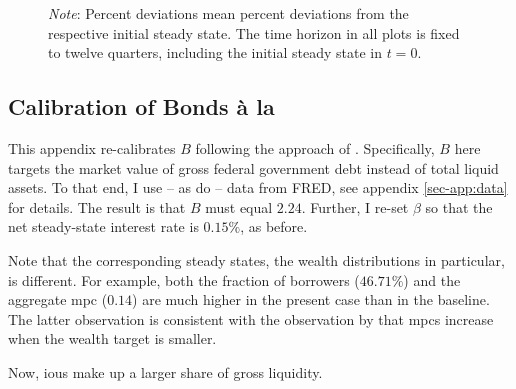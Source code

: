 \documentclass[a4paper,12pt]{article} %
\numberwithin{equation}{section} %
\numberwithin{figure}{section}
\numberwithin{table}{section}
\begin{document}
\begin{refsection}
\begin{appendices}
\begin{figure}[H]
     \vspace{10pt}
     
     \justifying
     \footnotesize
	\textit{Note}: Percent deviations mean percent deviations from the respective initial steady state. The time horizon in all plots is fixed to twelve quarters, including the initial steady state in $t=0$.
\end{figure}

\subsection{Calibration of Bonds à la \textcite{bayer2023}}
\label{sec-app:robust-bonds}

This appendix re-calibrates $B$ following the approach of \textcite{bayer2023}. Specifically, $B$ here targets the market value of gross federal government debt instead of total liquid assets. To that end, I use -- as \textcite{bayer2023} do -- data from FRED, see appendix \ref{sec-app:data} for details. The result is that $B$ must equal $2.24$. Further, I re-set $\beta$ so that the net steady-state interest rate is $0.15\%$, as before.

Note that the corresponding steady states, the wealth distributions in particular, is different. For example, both the fraction of borrowers ($46.71\%$) and the aggregate \Gls{mpc} ($0.14$) are much higher in the present case than in the baseline. The latter observation is consistent with the observation by \textcite{kaplan2018} that \Gls{mpc}s increase when the wealth target is smaller.

Now, \Gls{iou}s make up a larger share of gross liquidity. 


\end{appendices}
\end{refsection}
\end{document}
